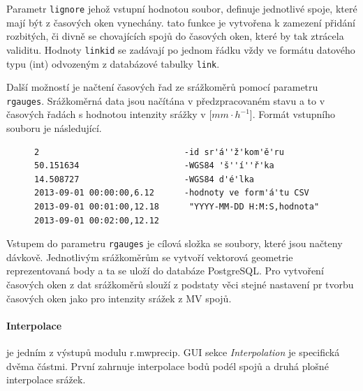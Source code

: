 \documentclass[a4paper,12pt]{report}
\begin{document}
Parametr \texttt{lignore} jehož vstupní hodnotou soubor, definuje jednotlivé spoje, které mají být z časových oken vynechány. tato funkce je vytvořena k zamezení přidání rozbitých, či divně se chovajících spojů do časových oken, které by tak ztrácela validitu. Hodnoty \texttt{linkid} se zadávají po jednom řádku vždy ve formátu datového typu (int) odvozeným z databázové tabulky \texttt{link}.

Další možností je načtení časových řad ze srážkoměrů pomocí parametru \texttt{rgauges}. Srážkoměrná data jsou načítána v předzpracovaném stavu a to v časových řadách s hodnotou intenzity srážky v [$mm \cdot h^{-1}$]. Formát vstupního souboru je následující.


\begin{figure}[h!]
\begin{footnotesize}
\lstset{extendedchars=false,
escapeinside=''}
\begin{lstlisting}[style=mybash]
2                             -id sr'á''ž'kom'ě'ru			
50.151634                     -WGS84 'š''í''ř'ka				
14.508727                     -WGS84 d'é'lka	
2013-09-01 00:00:00,6.12      -hodnoty ve form'á'tu CSV 
2013-09-01 00:01:00,12.18      "YYYY-MM-DD H:M:S,hodnota"		
2013-09-01 00:02:00,12.12

\end{lstlisting}
\end{footnotesize}
\end{figure}


Vstupem do parametru \texttt{rgauges} je cílová složka se soubory, které jsou načteny dávkově. Jednotlivým srážkoměrům se vytvoří vektorová geometrie reprezentovaná body a ta se uloží do databáze PostgreSQL. Pro vytvoření časových oken z dat srážkoměrů slouží z podstaty věci stejné nastavení pr tvorbu časových oken jako pro intenzity srážek z MV spojů.


\paragraph*{Interpolace} je jedním z výstupů modulu r.mwprecip. GUI sekce \textit{Interpolation} je specifická dvěma částmi. První zahrnuje interpolace bodů podél spojů a druhá plošné interpolace srážek.
\end{document}
